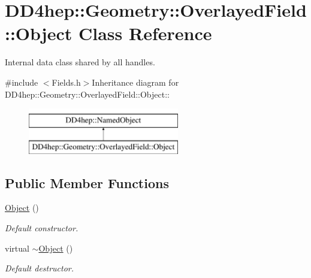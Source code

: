 \hypertarget{class_d_d4hep_1_1_geometry_1_1_overlayed_field_1_1_object}{
\section{DD4hep::Geometry::OverlayedField::Object Class Reference}
\label{class_d_d4hep_1_1_geometry_1_1_overlayed_field_1_1_object}
}


Internal data class shared by all handles.  


{\ttfamily \#include $<$Fields.h$>$}Inheritance diagram for DD4hep::Geometry::OverlayedField::Object::\begin{figure}[H]
\begin{center}
\leavevmode
\includegraphics[height=2cm]{class_d_d4hep_1_1_geometry_1_1_overlayed_field_1_1_object}
\end{center}
\end{figure}
\subsection*{Public Member Functions}
\begin{DoxyCompactItemize}
\item 
\hyperlink{class_d_d4hep_1_1_geometry_1_1_overlayed_field_1_1_object_a5c62fce5f0a4f429ff6560940cbc94ab}{Object} ()
\begin{DoxyCompactList}\small\item\em Default constructor. \item\end{DoxyCompactList}\item 
virtual \hyperlink{class_d_d4hep_1_1_geometry_1_1_overlayed_field_1_1_object_ad8d5178e3718579c79f92a4bb740e57d}{$\sim$Object} ()
\begin{DoxyCompactList}\small\item\em Default destructor. \item\end{DoxyCompactList}\end{DoxyCompactItemize}
